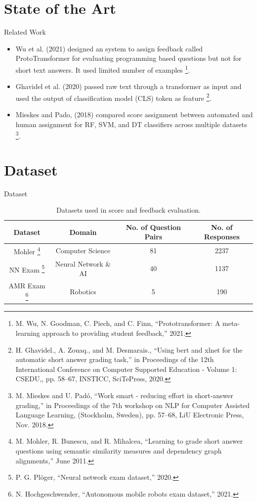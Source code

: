 \documentclass[aspectratio=169]{beamer}
\begin{document}
\section{State of the Art}
\begin{frame}{Related Work}
\begin{itemize}
	\item Wu et al. (2021) designed an system to assign feedback called ProtoTransformer for evaluating programming based questions but not for short text answers. It used limited number of examples \footnote{\footnotesize\tiny M. Wu, N. Goodman, C. Piech, and C. Finn, “Prototransformer: A meta-learning approach to
		providing student feedback,” 2021.}.
	
	\item Ghavidel et al. (2020) passed raw text through a transformer as input and used the output of classification model (CLS) token as feature \footnote{\footnotesize\tiny H. Ghavidel., A. Zouaq., and M. Desmarais., “Using bert and xlnet for the automatic short answer
		grading task,” in Proceedings of the 12th International Conference on Computer Supported
		Education - Volume 1: CSEDU,, pp. 58–67, INSTICC, SciTePress, 2020.}.
	
	\item Mieskes and Pado, (2018) compared score assignment between automated and human assignment for RF, SVM, and DT classifiers across multiple datasets \footnote{\footnotesize\tiny M. Mieskes and U. Pad\'o, “Work smart - reducing effort in short-answer grading,” in Proceedings of the
		7th workshop on NLP for Computer Assisted Language Learning, (Stockholm, Sweden), pp. 57–68,
		LiU Electronic Press, Nov. 2018.}.
\end{itemize}

\end{frame}

\section{Dataset}
\begin{frame}{Dataset}
\begin{table}
	\begin{tabular}{|c|c|c|c|}
		\hline
		\rowcolor{Gray}
		Dataset & Domain & No. of Question Pairs & No. of Responses\\
		\hline 
		Mohler \footnote{\footnotesize\tiny M. Mohler, R. Bunescu, and R. Mihalcea, “Learning to grade short answer questions using semantic
			similarity measures and dependency graph alignments,” June 2011.}& Computer Science& 81 & 2237 \\
		\hline
		NN Exam \footnote{\footnotesize\tiny P. G. Pl{\"o}ger, “Neural network exam dataset,” 2020.} & Neural Network \& AI & 40 & 1137 \\
		\hline
		AMR Exam \footnote{\footnotesize\tiny N. Hochgeschwender, “Autonomous mobile robots exam dataset,” 2021.}& Robotics & 5 & 190 \\
		\hline
	\end{tabular}
	\caption{Datasets used in score and feedback evaluation.}
\end{table}
\end{frame}
\end{document}
